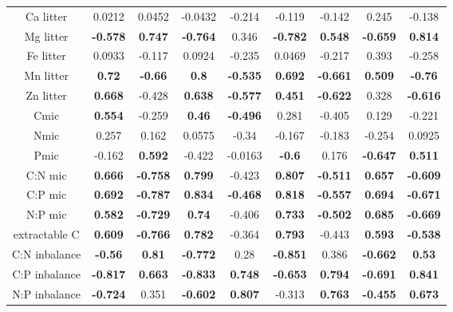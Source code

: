 \documentclass[authoryear,preprint,review,12pt]{elsarticle}
\begin{document}
\begin{table}[h!]
\begin{center}
{\begin{tabular}{ccccccccc}
  Ca litter & 0.0212 & 0.0452 & -0.0432 & -0.214 & -0.119 & -0.142 & 0.245 & -0.138 \\ 
  Mg litter & \textbf{ -0.578 } & \textbf{ 0.747 } & \textbf{ -0.764 } & 0.346 & \textbf{ -0.782 } & \textbf{ 0.548 } & \textbf{ -0.659 } & \textbf{ 0.814 } \\ 
  Fe litter & 0.0933 & -0.117 & 0.0924 & -0.235 & 0.0469 & -0.217 & 0.393 & -0.258 \\ 
  Mn litter & \textbf{ 0.72 } & \textbf{ -0.66 } & \textbf{  0.8 } & \textbf{ -0.535 } & \textbf{ 0.692 } & \textbf{ -0.661 } & \textbf{ 0.509 } & \textbf{ -0.76 } \\ 
  Zn litter & \textbf{ 0.668 } & -0.428 & \textbf{ 0.638 } & \textbf{ -0.577 } & \textbf{ 0.451 } & \textbf{ -0.622 } & 0.328 & \textbf{ -0.616 } \\ 
  Cmic & \textbf{ 0.554 } & -0.259 & \textbf{ 0.46 } & \textbf{ -0.496 } & 0.281 & -0.405 & 0.129 & -0.221 \\ 
  Nmic & 0.257 & 0.162 & 0.0575 & -0.34 & -0.167 & -0.183 & -0.254 & 0.0925 \\ 
  Pmic & -0.162 & \textbf{ 0.592 } & -0.422 & -0.0163 & \textbf{ -0.6 } & 0.176 & \textbf{ -0.647 } & \textbf{ 0.511 } \\ 
  C:N mic & \textbf{ 0.666 } & \textbf{ -0.758 } & \textbf{ 0.799 } & -0.423 & \textbf{ 0.807 } & \textbf{ -0.511 } & \textbf{ 0.657 } & \textbf{ -0.609 } \\ 
  C:P mic & \textbf{ 0.692 } & \textbf{ -0.787 } & \textbf{ 0.834 } & \textbf{ -0.468 } & \textbf{ 0.818 } & \textbf{ -0.557 } & \textbf{ 0.694 } & \textbf{ -0.671 } \\ 
  N:P mic & \textbf{ 0.582 } & \textbf{ -0.729 } & \textbf{ 0.74 } & -0.406 & \textbf{ 0.733 } & \textbf{ -0.502 } & \textbf{ 0.685 } & \textbf{ -0.669 } \\ 
  extractable C & \textbf{ 0.609 } & \textbf{ -0.766 } & \textbf{ 0.782 } & -0.364 & \textbf{ 0.793 } & -0.443 & \textbf{ 0.593 } & \textbf{ -0.538 } \\ 
  C:N inbalance & \textbf{ -0.56 } & \textbf{ 0.81 } & \textbf{ -0.772 } & 0.28 & \textbf{ -0.851 } & 0.386 & \textbf{ -0.662 } & \textbf{ 0.53 } \\ 
  C:P inbalance & \textbf{ -0.817 } & \textbf{ 0.663 } & \textbf{ -0.833 } & \textbf{ 0.748 } & \textbf{ -0.653 } & \textbf{ 0.794 } & \textbf{ -0.691 } & \textbf{ 0.841 } \\ 
  N:P inbalance & \textbf{ -0.724 } & 0.351 & \textbf{ -0.602 } & \textbf{ 0.807 } & -0.313 & \textbf{ 0.763 } & \textbf{ -0.455 } & \textbf{ 0.673 } \\ 
   \hline
\end{tabular}
}
\end{center}
\end{table}
\end{document}
